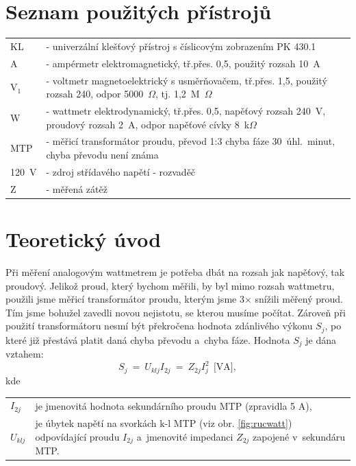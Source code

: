 \documentclass[a4paper,12pt]{article}   %
\newcommand{\tsub}[1]{$_\textrm{#1}$}
\newcommand{\tohm}{$\Omega$}
\begin{document}
\section{Seznam použitých přístrojů}
\begin{table}[h!]
  \begin{tabularx}{\textwidth}{lX}
    KL &    - univerzální klešťový přístroj s číslicovým zobrazením PK 430.1\\
    A  &    - ampérmetr elektromagnetický, tř.přes. 0,5, použitý rozsah 10~A\\
    V\tsub{1}  &- voltmetr magnetoelektrický s usměrňovačem, tř.přes. 1,5, použitý rozsah 240, odpor 5000~\tohm , tj. 1,2~M~\tohm \\
    W &     - wattmetr elektrodynamický, tř.přes. 0,5, napěťový rozsah 240~V, proudový rozsah 2~A, odpor napěťové cívky 8~k\tohm  \\
    MTP &   - měřicí transformátor proudu, převod 1:3 chyba fáze 30~úhl.~minut, chyba převodu není známa \\
    120~V&  - zdroj střídavého napětí - rozvaděč\\
    Z &     - měřená zátěž\\
  \end{tabularx}
\end{table}


\section{Teoretický úvod}
\label{chap:uvod}
Při měření analogovým wattmetrem je potřeba dbát na rozsah jak napěťový, tak proudový. Jelikož proud, který bychom měřili, by byl mimo rozsah wattmetru, použili jsme měřicí transformátor proudu, kterým jsme 3$\times$ snížili měřený proud. Tím jsme bohužel zavedli novou nejistotu, se kterou musíme počítat. Zároveň při použití transformátoru nesmí být překročena hodnota zdánlivého výkonu $S_j$, po které již přestává platit daná chyba převodu a~chyba fáze. Hodnota $S_j$ je dána vztahem:
\begin{equation*}
  S_j~=~U_{klj}I_{2j}~=~Z_{2j}I^2_j~~\textrm{[VA]},
\end{equation*}
kde 
\begin{tabularx}{\textwidth}{ll}
  $I_{2j}$ & je jmenovitá hodnota sekundárního proudu MTP (zpravidla 5 A),\\
  $U_{klj}$ & je úbytek napětí na svorkách k-l MTP (viz obr. \ref{fig:rucwatt}) odpovídající proudu $I_{2j}$ a~jmenovité impedanci $Z_{2j}$ zapojené v~sekundáru MTP.
\end{tabularx}
\end{document}
